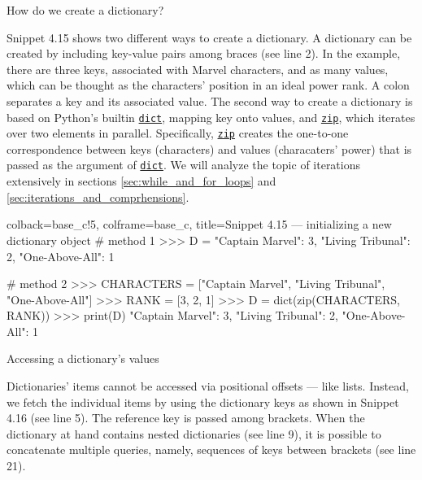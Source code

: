 \documentclass[a4paper,11pt]{book}
\numberwithin{figure}{chapter}
\numberwithin{table}{chapter}
\newcommand{\question}[1]{%
    \begin{tcolorbox}[colback=comp_c!10,colframe=comp_c,sidebyside align=top,width=\linewidth,before skip=1ex]
        #1
    \end{tcolorbox}
    \switchcolumn%
}
\newcommand{\note}[1]{%
    \begin{tcolorbox}[colback=white!0,colframe=white!10,width=\linewidth,before skip=1ex]
        #1
    \end{tcolorbox}
}
\begin{document}
\begin{paracol}{2}
	\question{\raggedright How do we create a dictionary?}
	\note{Snippet 4.15 shows two different ways to create a dictionary. A dictionary can be created by including key-value pairs among braces (see line 2). In the example, there are three keys, associated with Marvel characters, and as many values, which can be thought as the characters' position in an ideal power rank. A colon separates a key and its associated value. The second way to create a dictionary is based on Python's builtin \href{https://docs.python.org/3/library/stdtypes.html\#dict}{\texttt{dict}}, mapping key onto values, and \href{https://docs.python.org/3/library/functions.html\#zip}{\texttt{zip}}, which iterates over two elements in parallel. Specifically, \href{https://docs.python.org/3/library/functions.html\#zip}{\texttt{zip}} creates the one-to-one correspondence between keys (characters) and values (characaters' power) that is passed as the argument of \href{https://docs.python.org/3/library/stdtypes.html\#dict}{\texttt{dict}}. We will analyze the topic of iterations extensively in sections \ref{sec:while_and_for_loops} and \ref{sec:iterations_and_comprhensions}.}
\end{paracol}

\begin{pythoncode}[linenos=true,]{colback=base_c!5, colframe=base_c, title=\sffamily Snippet 4.15 --- initializing a new dictionary object}
# method 1 
>>> D = {"Captain Marvel": 3, "Living Tribunal": 2, "One-Above-All": 1}

# method 2
>>> CHARACTERS = ["Captain Marvel", "Living Tribunal", "One-Above-All"]
>>> RANK = [3, 2, 1]
>>> D = dict(zip(CHARACTERS, RANK)) 
>>> print(D)
{"Captain Marvel": 3, "Living Tribunal": 2, "One-Above-All": 1}
\end{pythoncode}
\clearpage

\begin{paracol}{2}
	\question{\raggedright Accessing a dictionary's values}
	\note{Dictionaries' items cannot be accessed via positional offsets --- like lists. Instead, we fetch the individual items by using the dictionary keys as shown in Snippet 4.16 (see line 5). The reference key is passed among brackets. When the dictionary at hand contains nested dictionaries (see line 9), it is possible to concatenate multiple queries, namely, sequences of keys between brackets (see line 21).}
\end{paracol}
\end{document}
